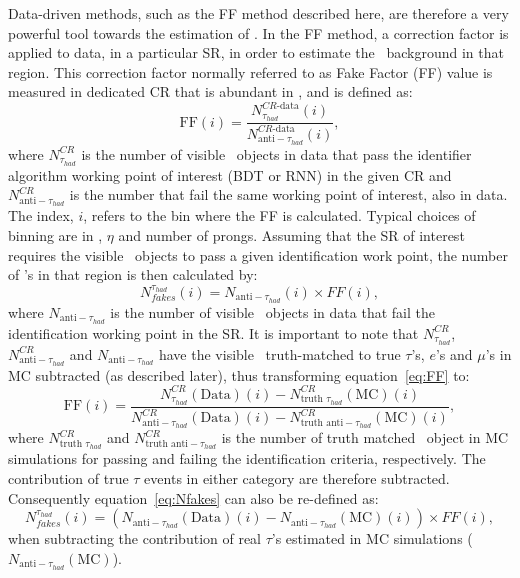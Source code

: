 	Data-driven methods, such as the \ac{FF} method described here, are therefore a very powerful tool towards the estimation of \ftau.
	In the \ac{FF} method, a correction factor is applied to data, in a particular \ac{SR}, in order to estimate the \ftau\ background in that region. 
	This correction factor normally referred to as Fake Factor (FF) value is measured in dedicated \ac{CR} that is abundant in \ftau, and  is defined as:	
	\begin{equation}
		\textrm{FF}(i)=\frac{N_{\tau_{had}}^{CR\textrm{-data}}(i)}{N_{\textrm{anti}-\tau_{had}}^{CR\textrm{-data}}(i)},
		\label{eq:FF}
	\end{equation}	
	where $N_{\tau_{had}}^{CR}$ is the number of visible \htau\ objects in data that pass the identifier algorithm working point of interest (\ac{BDT} or \ac{RNN}) in the given \ac{CR} and $N_{\textrm{anti}-\tau_{had}}^{CR}$ is the number that fail the same working point of interest, also in data. 
	The index, $i$, refers to the bin where the FF is calculated. Typical choices of binning are in \pt, $\eta$ and number of prongs.
	 Assuming that the SR of interest requires the visible \htau\ objects to pass a given identification work point, the number of \ftau's in that region is then calculated by:
	\begin{equation}
		N_{fakes}^{\tau_{had}}(i) = N_{\textrm{anti}-\tau_{had}}(i)\times FF(i),
		\label{eq:Nfakes}
	\end{equation}
	 where $N_{\textrm{anti}-\tau_{had}}$ is the number of visible \htau\ objects in data that fail the identification working point in the \ac{SR}. 
	 It is important to note that $N_{\tau_{had}}^{CR}$, $N_{\textrm{anti}-\tau_{had}}^{CR}$  and $N_{\textrm{anti}-\tau_{had}}$ have the visible \htau\ truth-matched to true $\tau$'s, $e$'s and $\mu$'s in MC subtracted (as described later), thus transforming equation~\ref{eq:FF} to:
	 \begin{equation}
		\textrm{FF}(i)=\frac{N_{\tau_{had}}^{CR}(\textrm{Data})(i)-N_{\textrm{truth }\tau_{had}}^{CR}(\textrm{MC})(i)}{N_{\textrm{anti}-\tau_{had}}^{CR}(\textrm{Data})(i)-N_{\textrm{truth }\textrm{anti}-\tau_{had}}^{CR}(\textrm{MC})(i)},
		\label{eq:FF-realT}
	\end{equation}
	 where $N_{\textrm{truth }\tau_{had}}^{CR}$ and $N_{\textrm{truth }\textrm{anti}-\tau_{had}}^{CR}$ is the number of truth matched \htau\ object in MC simulations for passing and failing the identification criteria, respectively. The contribution of true $\tau$ events in either category are therefore subtracted. Consequently equation~\ref{eq:Nfakes} can also be re-defined as:
	 \begin{equation}
		N_{fakes}^{\tau_{had}}(i) = (N_{\textrm{anti}-\tau_{had}}(\textrm{Data})(i)-N_{\textrm{anti}-\tau_{had}}(\textrm{MC})(i))\times FF(i),
		\label{eq:Nfakes-realT}
	\end{equation}
	 when subtracting the contribution of real $\tau$'s estimated in MC simulations ($N_{\textrm{anti}-\tau_{had}}(\textrm{MC})$).

